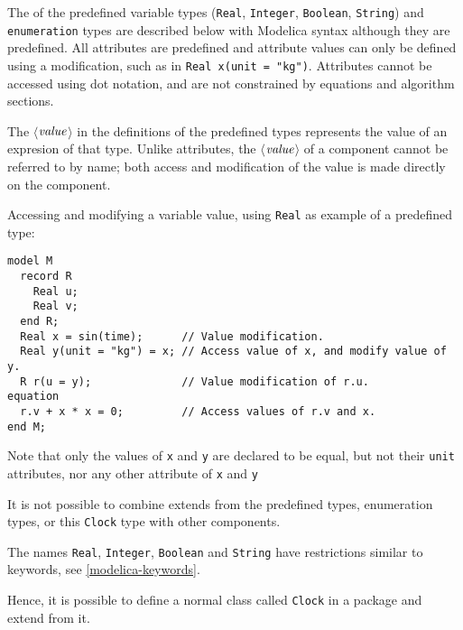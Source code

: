 The  of the predefined variable types (\lstinline!Real!, \lstinline!Integer!, \lstinline!Boolean!, \lstinline!String!) and \lstinline!enumeration! types are described below with Modelica syntax although they are predefined.
All attributes are predefined and attribute values can only be defined using a modification, such as in \lstinline!Real x(unit = "kg")!.
Attributes cannot be accessed using dot notation, and are not constrained by equations and algorithm sections.

The $\langle$$\mbox{\emph{value}}$$\rangle$ in the definitions of the predefined types represents the value of an expresion of that type.
Unlike attributes, the $\langle$$\mbox{\emph{value}}$$\rangle$ of a component cannot be referred to by name; both access and modification of the value is made directly on the component.

\begin{example}
Accessing and modifying a variable value, using \lstinline!Real! as example of a predefined type:
\begin{lstlisting}[language=modelica]
model M
  record R
    Real u;
    Real v;
  end R;
  Real x = sin(time);      // Value modification.
  Real y(unit = "kg") = x; // Access value of x, and modify value of y.
  R r(u = y);              // Value modification of r.u.
equation
  r.v + x * x = 0;         // Access values of r.v and x.
end M;
\end{lstlisting}
Note that only the values of \lstinline!x! and \lstinline!y! are declared to be equal, but not their \lstinline!unit! attributes, nor any other attribute of \lstinline!x! and \lstinline!y!
\end{example}

It is not possible to combine extends from the predefined types, enumeration types, or this \lstinline!Clock! type with other components.

The names \lstinline!Real!, \lstinline!Integer!, \lstinline!Boolean! and \lstinline!String! have restrictions similar to keywords, see \cref{modelica-keywords}.

\begin{nonnormative}
Hence, it is possible to define a normal class called \lstinline!Clock! in a package and extend from it.
\end{nonnormative}

